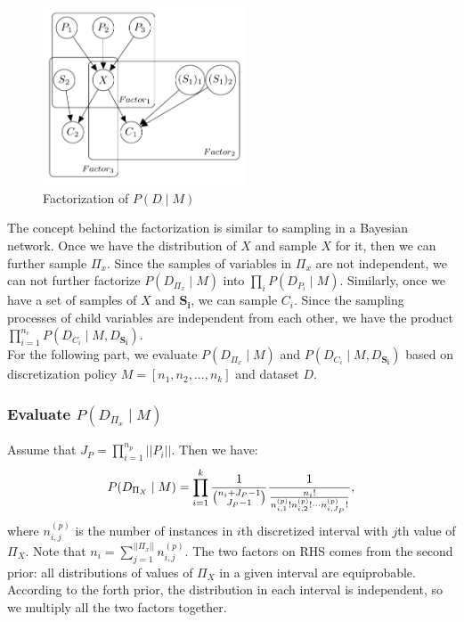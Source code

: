 \begin{figure}
  \includegraphics[width=6cm]{graph1.png}
\caption{Factorization of $P(D \mid M)$}
\label{fig:1}       %
\end{figure}

The concept behind the factorization is similar to sampling in a Bayesian network. Once we have the distribution of $X$ and sample $X$ for it, then we can further sample $\Pi_x$. Since the samples of variables in $\Pi_x$ are not independent, we can not further factorize $P(D_{\Pi_x} \mid M)$ into $\prod_i P(D_{P_i} \mid M)$. Similarly, once we have a set of samples of $X$ and $\boldsymbol{S_i}$, we can sample $C_i$. Since the sampling processes of child variables are independent from each other, we have the product $\prod_{i = 1}^{n_c} P(D_{C_i} \mid M, D_{\boldsymbol{S_i}})$.\\

For the following part, we evaluate $P(D_{\Pi_x} \mid M)$  and $P(D_{C_i} \mid M, D_{\boldsymbol{S_i}})$ based on discretization policy $M = [n_1,n_2,...,n_k]$ and dataset $D$.
\subsubsection{Evaluate $P(D_{\Pi_x} \mid M)$}
Assume that $J_P = \prod_{i=1}^{n_p} || P_i ||$. Then we have:
\begin{equation}
P(D_{\Pi_X} \mid M) = \prod_{i=1}^k  {{1}\over{{n_i + J_P - 1}\choose{J_P -1}}}
{{1}\over{ {{{n}_i}!}\over{ {n^{(p)}_{i,1} !} {n^{(p)}_{i,2} !} \cdots {n^{(p)}_{i,J_P} !}}  }},
\end{equation}
where $n^{(p)}_{i,j}$ is the number of instances in $i$th discretized interval with $j$th value of $\Pi_X$. Note that $n_i = \sum_{j=1}^{|| \Pi_x ||} n^{(p)}_{i,j}$. The two factors on RHS comes from the second prior: all distributions of values of $\Pi_X$ in a given interval are equiprobable. According to the forth prior, the distribution in each interval is independent, so we multiply all the two factors together.
